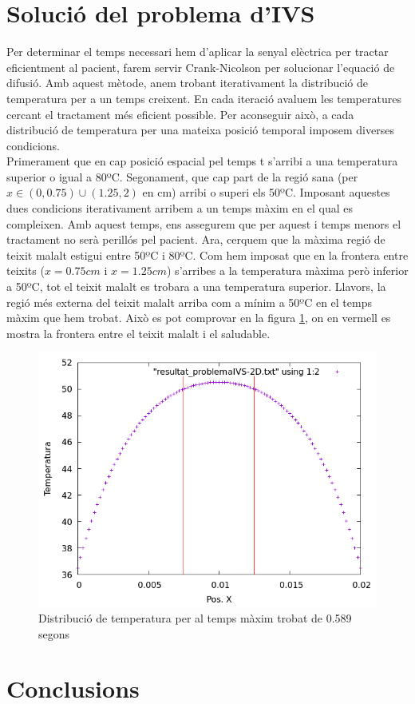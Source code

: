 \documentclass{article}
\begin{document}
\section{Solució del problema d'IVS}
Per determinar el temps necessari hem d'aplicar la senyal elèctrica per tractar eficientment al pacient, farem servir Crank-Nicolson per solucionar l'equació de difusió. Amb aquest mètode, anem trobant iterativament la distribució de temperatura per a un temps creixent. En cada iteració avaluem les temperatures cercant el tractament més eficient possible. Per aconseguir això, a cada distribució de temperatura per una mateixa posició temporal imposem diverses condicions. \\ Primerament que en cap posició espacial pel temps t s'arribi a una temperatura superior o igual a 80ºC. Segonament, que cap part de la regió sana (per $x\in(0,0.75) \cup (1.25,2)$ en cm) arribi o superi els 50ºC. Imposant aquestes dues condicions iterativament arribem a un temps màxim en el qual es compleixen. Amb aquest temps, ens assegurem que per aquest i temps menors el tractament no serà perillós pel pacient. Ara, cerquem que la màxima regió de teixit malalt estigui entre 50ºC i 80ºC. Com hem imposat que en la frontera entre teixits ($x =0.75cm$ i $x=1.25cm$) s'arribes a la temperatura màxima però inferior a 50ºC, tot el teixit malalt es trobara a una temperatura superior. Llavors, la regió més externa del teixit malalt arriba com a mínim a 50ºC en el temps màxim que hem trobat. Això es pot comprovar en la figura \ref{fig:solucion_ivs}, on en vermell es mostra la frontera entre el teixit malalt i el saludable. 

\begin{figure}[h]
    \centering
    \includegraphics[width=0.5\linewidth]{images/solucion_IVS-2D.png}
    \caption{Distribució de temperatura per al temps màxim trobat de 0.589 segons}
    \label{fig:solucion_ivs}
\end{figure}

\section{Conclusions}
\end{document}
